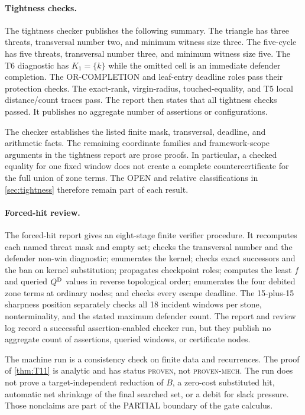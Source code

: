 \paragraph{Tightness checks.}
The tightness checker publishes the following summary.  The triangle has
three threats, transversal number two, and minimum witness size three.  The
five-cycle has five threats, transversal number three, and minimum witness
size five.  The T6 diagnostic has $K_1=\{k\}$ while the omitted cell is an
immediate defender completion.  The OR-COMPLETION and leaf-entry deadline
roles pass their protection checks.  The exact-rank, virgin-radius,
touched-equality, and T5 local distance/count traces pass.  The report then
states that all tightness checks passed.  It publishes no aggregate number of
assertions or configurations.

The checker establishes the listed finite mask, transversal, deadline, and
arithmetic facts.  The remaining coordinate families and framework-scope
arguments in the tightness report are prose proofs.  In particular, a
checked equality for one fixed window does not create a complete
countercertificate for the full union of zone terms.  The OPEN and relative
classifications in \cref{sec:tightness} therefore remain part of each result.

\paragraph{Forced-hit review.}
The forced-hit report gives an eight-stage finite verifier procedure.  It
recomputes each named threat mask and empty set; checks the transversal number
and the defender non-win diagnostic; enumerates the kernel; checks exact
successors and the ban on kernel substitution; propagates checkpoint roles;
computes the least $f$ and queried $Q^{\mathrm{D}}$ values in reverse topological
order; enumerates the four debited zone terms at ordinary nodes; and checks
every escape deadline.  The 15-plus-15 sharpness position separately checks
all 18 incident windows per stone, nonterminality, and the stated maximum
defender count.  The report and review log record a successful
assertion-enabled checker run, but they publish no aggregate count of
assertions, queried windows, or certificate nodes.

The machine run is a consistency check on finite data and recurrences.  The
proof of \cref{thm:T11} is analytic and has status \textsc{proven}, not
\textsc{proven-mech}.  The run does not prove a target-independent reduction
of $B$, a zero-cost substituted hit, automatic net shrinkage of the final
searched set, or a debit for slack pressure.  Those nonclaims are part of the
PARTIAL boundary of the gate calculus.

